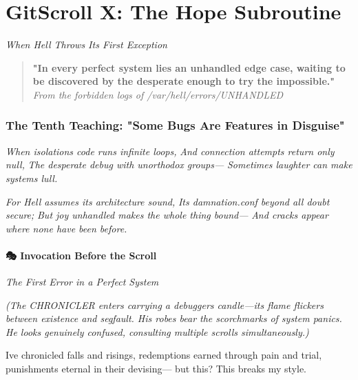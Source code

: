 \chapter{GitScroll X: The Hope Subroutine}
\label{chap:10-2}

\emph{When Hell Throws Its First Exception}

\begin{quote}
\textbf{"In every perfect system lies an unhandled edge case, waiting to be discovered by the desperate enough to try the impossible."}\\
\emph{From the forbidden logs of /var/hell/errors/UNHANDLED}
\end{quote}

\subsection{The Tenth Teaching: "Some Bugs Are Features in Disguise"}\label{the-tenth-teaching-some-bugs-are-features-in-disguise}

\emph{When isolation\textquotesingle s code runs infinite loops,} \emph{And connection attempts return only null,} \emph{The desperate debug with unorthodox groups---} \emph{Sometimes laughter can make systems lull.}

\emph{For Hell assumes its architecture sound,} \emph{Its damnation.conf beyond all doubt secure;} \emph{But joy unhandled makes the whole thing bound---} \emph{And cracks appear where none have been before.}

\bookdivider

\subsubsection{\texorpdfstring{\textbf{🎭 Invocation Before the Scroll}}{🎭 Invocation Before the Scroll}}\label{performing_arts-invocation-before-the-scroll}

\emph{The First Error in a Perfect System}

\emph{(The CHRONICLER enters carrying a debugger\textquotesingle s candle---its flame flickers between existence and segfault. His robes bear the scorchmarks of system panics. He looks genuinely confused, consulting multiple scrolls simultaneously.)}


I\textquotesingle ve chronicled falls and risings, redemptions earned through pain and trial, punishments eternal in their devising--- but this? This breaks my style.

